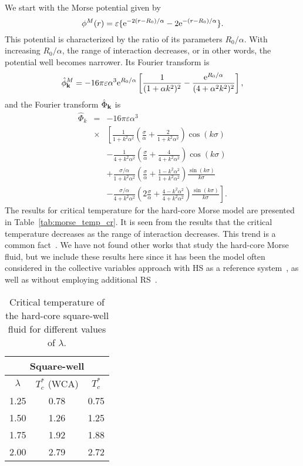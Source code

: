 We start with the Morse potential given by
\begin{equation*}
	\phi^M(r) = \varepsilon \{{\rm e}^{-2(r-R_0)/\alpha}-2{\rm e}^{-(r-R_0)/\alpha}\}.
\end{equation*}
This potential is characterized by the ratio of its parameters $R_0/\alpha$. With increasing $R_0/\alpha$, the range of interaction decreases, or in other words, the potential well becomes narrower.
Its Fourier transform is
\begin{equation*}
	\hat{\phi}^M_{\vb k} = -16\pi\varepsilon\alpha^3 {\rm e}^{R_0/\alpha} 
	\left[\frac{1}{(1 + \alpha k^2)^2} - \frac{{\rm e}^{R_0/\alpha}}{(4 + \alpha^2 k^2)^2}\right],
\end{equation*}
and the Fourier transform $\hat{\Phi}_{\vb k}$ is
\begin{eqnarray*}
	\label{eq:part_morse_fourier}
	\hat{\Phi}_k &=& -16\pi \varepsilon \alpha^3 
	\\
	&\times&
	\left[
	\frac{1}{1+k^2\alpha^2}\left(\frac{\sigma}{\alpha} + \frac{2}{1+k^2\alpha^2}\right) \cos(k\sigma)
	\right.
	\nonumber\\
	&& \left.
	-\frac{1}{4 + k^2\alpha^2} \left(\frac{\sigma}{\alpha} + \frac{4}{4 + k^2\alpha^2}\right) \cos(k\sigma)
	\right.
	\nonumber \\
	&& \left.
	+ \frac{\sigma/\alpha}{1 + k^2\alpha^2} \left(\frac{\sigma}{\alpha} + \frac{1 - k^2\alpha^2}{1 + k^2 \alpha^2}\right) \frac{\sin(k\sigma)}{k\sigma}
	\right.
	\nonumber\\
	&& \left.
	- \frac{\sigma/\alpha}{4 + k^2\alpha^2} \left(2\frac{\sigma}{\alpha} + \frac{4 - k^2\alpha^2}{4 + k^2\alpha^2}\right) \frac{\sin(k\sigma)}{k\sigma}
	\right].
\end{eqnarray*}
The results for critical temperature for the hard-core Morse model are presented in Table~\ref{tab:morse_temp_cr}. It is seen from the results that the critical temperature decreases as the range of interaction decreases. This trend is a common fact~\cite{KreiciNezbeda2012,MendoubWaxJakse2010}.
We have not found other works that study the hard-core Morse fluid, but we include these results here since it has been the model often considered in the collective variables approach with HS as a reference system~\cite{Yukh1990,YukhJSP1995,PatsJSP1995}, as well as without employing additional RS~\cite{PylMpkDobUPJ2023b,PylJML2023}.

\begin{table}[h]
	\noindent\caption{Critical temperature of the hard-core square-well fluid for different values of $\lambda$.}\vskip3mm
	\begin{tabular}{|c|c|c|}
		\hline
		\multicolumn{3}{|c|}{Square-well}\\
		\hline
		$\lambda$ & $T_c^*$ (WCA) & $T_c^*$ \cite{KreiciNezbeda2012} \\
		\hline
		1.25 & 0.78 & 0.75 \\
		1.50 & 1.26 & 1.25 \\
		1.75 & 1.92 & 1.88 \\
		2.00  & 2.79 & 2.72 \\
		\hline
	\end{tabular}
	\label{tab:sw_temp_cr}
\end{table}

